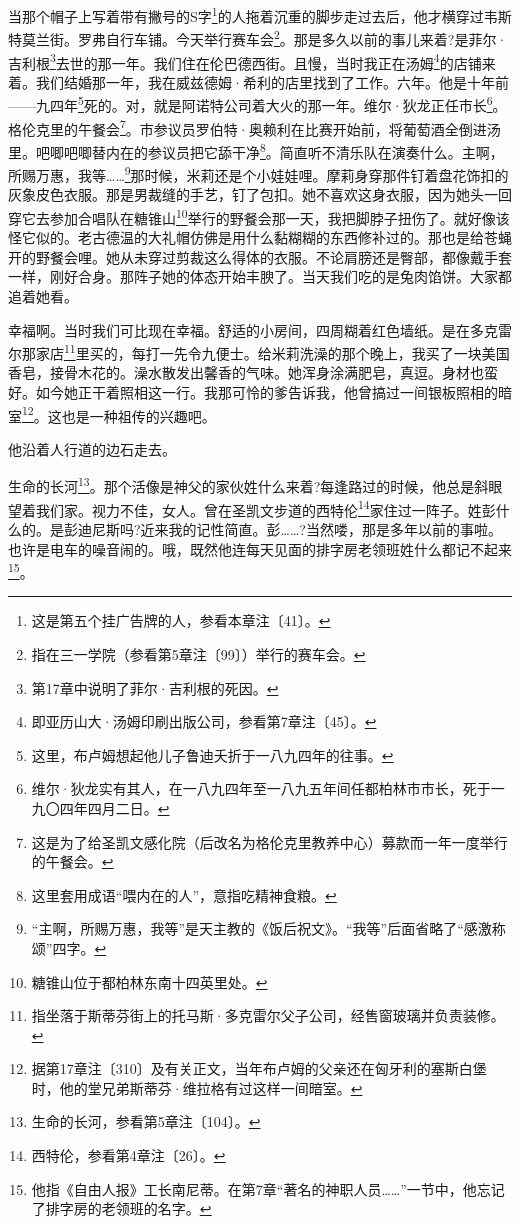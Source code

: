 \par 当那个帽子上写着带有撇号的S字\footnote{这是第五个挂广告牌的人，参看本章注〔41〕。}的人拖着沉重的脚步走过去后，他才横穿过韦斯特莫兰街。罗弗自行车铺。今天举行赛车会\footnote{指在三一学院（参看第5章注〔99〕）举行的赛车会。}。那是多久以前的事儿来着?是菲尔·吉利根\footnote{第17章中说明了菲尔·吉利根的死因。}去世的那一年。我们住在伦巴德西街。且慢，当时我正在汤姆\footnote{即亚历山大·汤姆印刷出版公司，参看第7章注〔45〕。}的店铺来着。我们结婚那一年，我在威兹德姆·希利的店里找到了工作。六年。他是十年前——九四年\footnote{这里，布卢姆想起他儿子鲁迪夭折于一八九四年的往事。}死的。对，就是阿诺特公司着大火的那一年。维尔·狄龙正任市长\footnote{维尔·狄龙实有其人，在一八九四年至一八九五年间任都柏林市市长，死于一九〇四年四月二日。}。格伦克里的午餐会\footnote{这是为了给圣凯文感化院（后改名为格伦克里教养中心）募款而一年一度举行的午餐会。}。市参议员罗伯特·奥赖利在比赛开始前，将葡萄酒全倒进汤里。吧唧吧唧替内在的参议员把它舔干净\footnote{这里套用成语“喂内在的人”，意指吃精神食粮。}。简直听不清乐队在演奏什么。主啊，所赐万惠，我等……\footnote{“主啊，所赐万惠，我等”是天主教的《饭后祝文》。“我等”后面省略了“感激称颂”四字。}那时候，米莉还是个小娃娃哩。摩莉身穿那件钉着盘花饰扣的灰象皮色衣服。那是男裁缝的手艺，钉了包扣。她不喜欢这身衣服，因为她头一回穿它去参加合唱队在糖锥山\footnote{糖锥山位于都柏林东南十四英里处。}举行的野餐会那一天，我把脚脖子扭伤了。就好像该怪它似的。老古德温的大礼帽仿佛是用什么黏糊糊的东西修补过的。那也是给苍蝇开的野餐会哩。她从未穿过剪裁这么得体的衣服。不论肩膀还是臀部，都像戴手套一样，刚好合身。那阵子她的体态开始丰腴了。当天我们吃的是兔肉馅饼。大家都追着她看。
\par 幸福啊。当时我们可比现在幸福。舒适的小房间，四周糊着红色墙纸。是在多克雷尔那家店\footnote{指坐落于斯蒂芬街上的托马斯·多克雷尔父子公司，经售窗玻璃并负责装修。}里买的，每打一先令九便士。给米莉洗澡的那个晚上，我买了一块美国香皂，接骨木花的。澡水散发出馨香的气味。她浑身涂满肥皂，真逗。身材也蛮好。如今她正干着照相这一行。我那可怜的爹告诉我，他曾搞过一间银板照相的暗室\footnote{据第17章注〔310〕及有关正文，当年布卢姆的父亲还在匈牙利的塞斯白堡时，他的堂兄弟斯蒂芬·维拉格有过这样一间暗室。}。这也是一种祖传的兴趣吧。
\par 他沿着人行道的边石走去。
\par 生命的长河\footnote{生命的长河，参看第5章注〔104〕。}。那个活像是神父的家伙姓什么来着?每逢路过的时候，他总是斜眼望着我们家。视力不佳，女人。曾在圣凯文步道的西特伦\footnote{西特伦，参看第4章注〔26〕。}家住过一阵子。姓彭什么的。是彭迪尼斯吗?近来我的记性简直。彭……?当然喽，那是多年以前的事啦。也许是电车的噪音闹的。哦，既然他连每天见面的排字房老领班姓什么都记不起来\footnote{他指《自由人报》工长南尼蒂。在第7章“著名的神职人员……”一节中，他忘记了排字房的老领班的名字。}。
